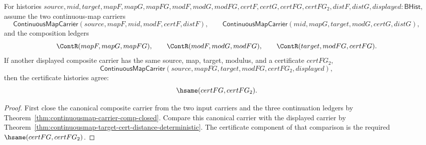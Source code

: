 \begin{theorem}
\label{thm:continuousmap-comp-certificate-deterministic}
For histories
$source,mid,target,mapF,mapG,mapFG,modF,modG,modFG,certF,certG,certFG,certFG_2,distF,distG,displayed:\mathsf{BHist}$,
assume the two continuous-map carriers
$$
\mathsf{ContinuousMapCarrier}(source,mapF,mid,modF,certF,distF),
\qquad
\mathsf{ContinuousMapCarrier}(mid,mapG,target,modG,certG,distG),
$$
and the composition ledgers
$$
\ContR(mapF,mapG,mapFG),\qquad
\ContR(modF,modG,modFG),\qquad
\ContR(target,modFG,certFG).
$$
If another displayed composite carrier has the same source, map, target,
modulus, and a certificate $certFG_2$,
$$
\mathsf{ContinuousMapCarrier}(source,mapFG,target,modFG,certFG_2,displayed),
$$
then the certificate histories agree:
$$
\hsame(certFG,certFG_2).
$$
\end{theorem}
\begin{proof}
First close the canonical composite carrier from the two input carriers and the
three continuation ledgers by
Theorem~\ref{thm:continuousmap-carrier-comp-closed}. Compare this canonical
carrier with the displayed carrier by
Theorem~\ref{thm:continuousmap-target-cert-distance-deterministic}. The
certificate component of that comparison is the required
$\hsame(certFG,certFG_2)$.
\end{proof}

